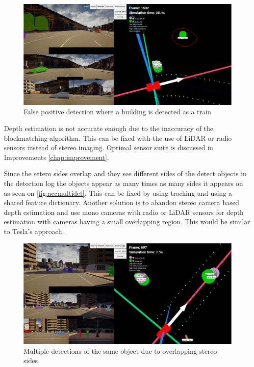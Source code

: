 \begin{figure}[!ht]
	\centering
	\includegraphics[width=150mm, keepaspectratio]{figures/accfalsepositive.png}
	\caption{False positive detection where a building is detected as a train}
	\label{fig:accfalsepositive}
\end{figure}


Depth estimation is not accurate enough due to the inaccuracy of the
blockmatching algorithm. This can be fixed with the use of LiDAR or radio
sensors instead of stereo imaging. Optimal sensor suite is discussed in
Improvements \autoref{chap:improvement}.

Since the setero sides overlap and they see different sides of the detect
objects in the detection log the objects appear as many times as many sides it
appears on as seen on \autoref{fig:accmultidet}. This can be fixed by using tracking and using a shared feature
dictionary. Another solution is to abandon stereo camera based depth estimation
and use mono cameras with radio or LiDAR sensors for depth estimation with
cameras having a small overlapping region. This would be similar to Tesla's
approach.

\begin{figure}[!ht]
	\centering
	\includegraphics[width=150mm, keepaspectratio]{figures/accmultidet.png}
	\caption{Multiple detections of the same object due to overlapping stereo sides}
	\label{fig:accmultidet}
\end{figure}

